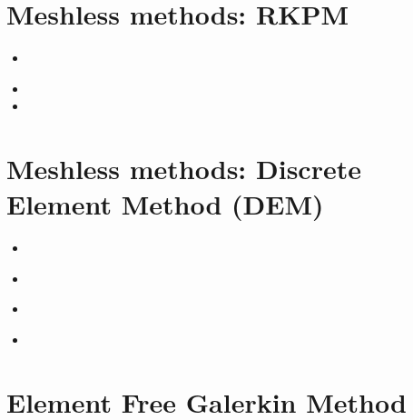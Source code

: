 \section{Meshless methods: RKPM}

\begin{scriptsize}
\begin{itemize}
\item[\twothousand]
\\
\item[\twothousandtwo]  
\item[\twothousandfour] 
\end{itemize}
\end{scriptsize}

\section{Meshless methods: Discrete Element Method (DEM)}

\begin{scriptsize}
\begin{itemize}
\item[\twothousandsix] 
\item[\twothousandthirteen]
\\
\item[\twothousandnineteen] 
\\
\item[\twothousandtwentytwo] 
\end{itemize}
\end{scriptsize}

\section{Element Free Galerkin Method}


